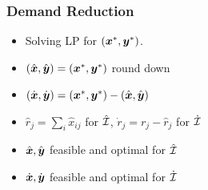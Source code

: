 \documentclass[handout, hyperref, dvipsnames]{beamer}
\begin{document}
\begin{frame}
  \frametitle{Demand Reduction}

  \begin{itemize}
  \item Solving LP for $(\boldsymbol{x}^\ast, \boldsymbol{y}^\ast)$.
  \item $(\hat{\boldsymbol{x}}, \hat{\boldsymbol{y}}) = (\boldsymbol{x}^\ast, \boldsymbol{y}^\ast)$ round down
  \item $(\dot{\boldsymbol{x}}, \dot{\boldsymbol{y}}) = (\boldsymbol{x}^\ast, \boldsymbol{y}^\ast) - (\hat{\boldsymbol{x}}, \hat{\boldsymbol{y}})$
  \item $\hat r_j = \sum_{i}\hat x_{ij}$ for $\hat{\mathcal{I}}$, $\dot r_j = r_j - \hat r_j$ for $\dot{\mathcal{I}}$
  \item $\hat{\boldsymbol{x}}, \hat{\boldsymbol{y}}$ feasible and optimal for $\hat{\mathcal{I}}$
  \item $\dot{\boldsymbol{x}}, \dot{\boldsymbol{y}}$ feasible and optimal for $\dot{\mathcal{I}}$
  \end{itemize}
\end{frame}
\end{document}
